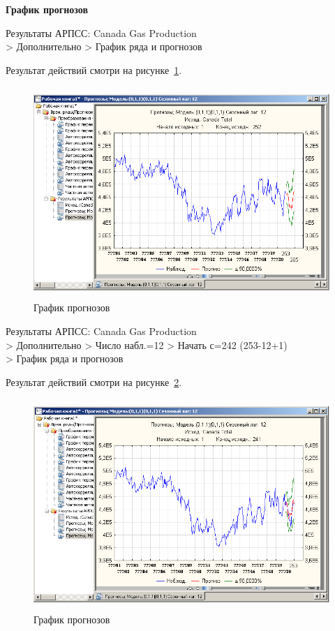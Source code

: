 \begin{center}
  \textbf{График прогнозов}
\end{center}

Результаты АРПСС: Canada Gas Production\\
> Дополнительно > График ряда и прогнозов

Результат действий смотри на рисунке~\ref{fig:2_15}.

\begin{figure}[!h]
  \centering

  \includegraphics[height=8cm]
  {inc/Canada_Gas_Production/15.PNG}

  \caption{График прогнозов}

  \label{fig:2_15}
\end{figure}


\newpage

Результаты АРПСС: Canada Gas Production\\
> Дополнительно
> Число набл.=12
> Начать с=242 (253-12+1)\\
> График ряда и прогнозов

Результат действий смотри на рисунке~\ref{fig:2_16}.

\begin{figure}[!h]
  \centering

  \includegraphics[height=8cm]
  {inc/Canada_Gas_Production/16.PNG}

  \caption{График прогнозов}

  \label{fig:2_16}
\end{figure}

